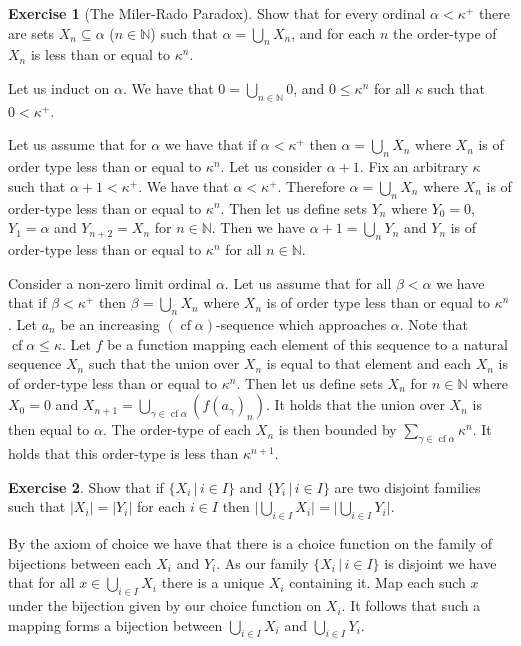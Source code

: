 \documentclass{article}
\theoremstyle{definition}
\newtheorem{exer}{Exercise}[section]
\newcommand{\N}{\mathbb{N}}
\DeclareMathOperator{\cf}{cf}
\newcommand{\abs}[1]{\lvert#1\rvert}
\newlength{\defparindent}
\newenvironment{answer}
    {\begin{mdframed}[backgroundcolor=gray!15, linewidth=0pt] \setlength{\parindent}{\defparindent}}
    {\end{mdframed}}
\begin{document}
\begin{exer}[The Miler-Rado Paradox]
    Show that for every ordinal $\alpha < \kappa^+$ there are sets $X_n \subseteq \alpha$ ($n \in \N$) such that $\alpha = \bigcup_n X_n$, and for each $n$ the order-type of $X_n$ is less than or equal to $\kappa^n$.
    \begin{answer}
        Let us induct on $\alpha$. We have that $0 = \bigcup_{n \in \N} 0$, and $0 \le \kappa^n$ for all $\kappa$ such that $0 < \kappa^+$. 
        
        Let us assume that for $\alpha$ we have that if $\alpha < \kappa^+$ then $\alpha = \bigcup_n X_n$ where $X_n$ is of order type less than or equal to $\kappa^n$. Let us consider $\alpha + 1$. Fix an arbitrary $\kappa$ such that $\alpha + 1 < \kappa^+$. We have that $\alpha < \kappa^+$. Therefore $\alpha = \bigcup_n X_n$ where $X_n$ is of order-type less than or equal to $\kappa^n$. Then let us define sets $Y_n$ where $Y_0 = 0$, $Y_1 = \alpha$ and $Y_{n + 2} = X_n$ for $n \in \N$. Then we have $\alpha + 1 = \bigcup_n Y_n$ and $Y_n$ is of order-type less than or equal to $\kappa^n$ for all $n \in \N$.

        Consider a non-zero limit ordinal $\alpha$. Let us assume that for all $\beta < \alpha$ we have that if $\beta < \kappa^+$ then $\beta = \bigcup_n X_n$ where $X_n$ is of order type less than or equal to $\kappa^n$. Let $a_n$ be an increasing $(\cf \alpha)$-sequence which approaches $\alpha$. Note that $\cf \alpha \le \kappa$. Let $f$ be a function mapping each element of this sequence to a natural sequence $X_n$ such that the union over $X_n$ is equal to that element and each $X_n$ is of order-type less than or equal to $\kappa^n$. Then let us define sets $X_n$ for $n \in \N$ where $X_0 = 0$ and $X_{n + 1} = \bigcup_{\gamma \in \cf \alpha} (f(a_\gamma)_n)$. It holds that the union over $X_n$ is then equal to $\alpha$. The order-type of each $X_n$ is then bounded by $\sum_{\gamma \in \cf \alpha} \kappa^n$. It holds that this order-type is less than $\kappa^{n + 1}$. 
    \end{answer}
\end{exer}

\begin{exer}
    Show that if $\{ X_i \, | \, i \in I \}$ and $\{ Y_i \, | \, i \in I \}$ are two disjoint families such that $\abs{X_i} = \abs{Y_i}$ for each $i \in I$ then $\abs{\bigcup_{i \in I} X_i} = \abs{\bigcup_{i \in I} Y_i}$.
    \begin{answer}
        By the axiom of choice we have that there is a choice function on the family of bijections between each $X_i$ and $Y_i$. As our family $\{ X_i \, | \, i \in I \}$ is disjoint we have that for all $x \in \bigcup_{i \in I} X_i$ there is a unique $X_i$ containing it. Map each such $x$ under the bijection given by our choice function on $X_i$. It follows that such a mapping forms a bijection between $\bigcup_{i \in I} X_i$ and $\bigcup_{i \in I} Y_i$.    
    \end{answer}
\end{exer}
\end{document}
